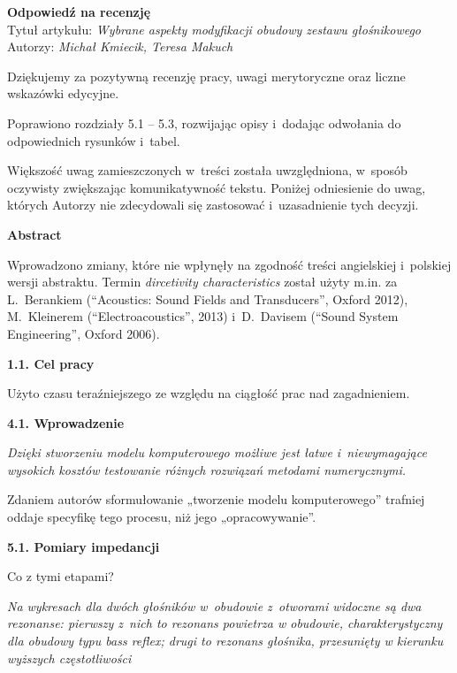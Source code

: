 \documentclass[12pt]{article}
\begin{document}
    
    \begin{center}
        \textbf{Odpowiedź na recenzję }\\
        \vspace{10pt}
        Tytuł artykułu: \textit{Wybrane aspekty modyfikacji obudowy zestawu głośnikowego} \\
        Autorzy: \textit{Michał Kmiecik, Teresa Makuch}
    \end{center}
    

    Dziękujemy za pozytywną recenzję pracy, uwagi merytoryczne oraz liczne wskazówki edycyjne.
    
    Poprawiono rozdziały 5.1 -- 5.3, rozwijając opisy i~dodając odwołania do odpowiednich rysunków i~tabel.
    
    Większość uwag zamieszczonych w~treści została uwzględniona, w~sposób oczywisty zwiększając komunikatywność tekstu. Poniżej odniesienie do uwag, których Autorzy nie zdecydowali się zastosować i~uzasadnienie tych decyzji.
    
    \textbf{Abstract}
    
    Wprowadzono zmiany, które nie wpłynęły na zgodność treści angielskiej i~polskiej wersji abstraktu. Termin \textit{dircetivity characteristics} został użyty m.in. za L.~Berankiem (\textquotedblleft Acoustics: Sound Fields and Transducers\textquotedblright, Oxford 2012), M.~Kleinerem (\textquotedblleft Electroacoustics\textquotedblright, 2013) i~D.~Davisem (\textquotedblleft Sound System Engineering\textquotedblright, Oxford 2006).
    
    \textbf{1.1. Cel pracy}
    
    Użyto czasu teraźniejszego ze względu na ciągłość prac nad zagadnieniem.
    
    \textbf{4.1. Wprowadzenie}
    
    \textit{Dzięki stworzeniu modelu komputerowego możliwe jest łatwe i~niewymagające wysokich kosztów testowanie różnych rozwiązań metodami numerycznymi.}
    
    Zdaniem autorów sformułowanie „tworzenie modelu komputerowego” trafniej oddaje specyfikę tego procesu, niż jego „opracowywanie”.
    
    \textbf{5.1. Pomiary impedancji}
    
    Co z tymi etapami?
    
    \textit{Na wykresach dla dwóch głośników w~obudowie z~otworami widoczne są dwa rezonanse: pierwszy z~nich to rezonans powietrza w obudowie, charakterystyczny dla obudowy typu \emph{bass reflex}; drugi to rezonans głośnika, przesunięty w kierunku wyższych częstotliwości}
    
\end{document}
